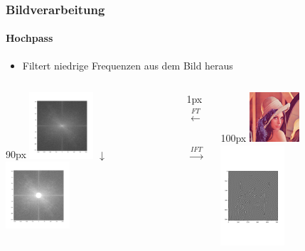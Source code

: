 \begin{frame}
    \frametitle{Bildverarbeitung}
    \framesubtitle{Hochpass}
    \begin{itemize}
        \item Filtert niedrige Frequenzen aus dem Bild heraus
    \end{itemize}
    \begin{columns}[c]
        \begin{column}{90px}
            \centering
            \includegraphics[width=90px]{images/04-applications-image-lena-ft.png}
            $\downarrow$
            \includegraphics[width=90px]{images/04-applications-image-lena-ft-high-pass-ft.png}
        \end{column}
        \hspace*{-35px}
        \begin{column}{1px}
            \vspace*{-13px}
            \begin{align*}
                \overset{FT}\longleftarrow \\ \\ \\ \\ \\ \\
                \overset{IFT}\longrightarrow
            \end{align*}
        \end{column}
        \hspace*{-35px}
        \begin{column}{100px}
            \centering
            \includegraphics[width=70px]{images/04-applications-image-lena.png}
            \vspace*{-30px}
            \includegraphics[width=90px]{images/04-applications-image-lena-ft-high-pass.png}
        \end{column}
    \end{columns}
\end{frame}

